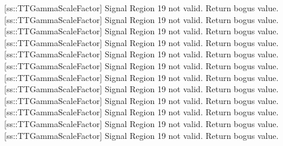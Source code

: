 [ss::TTGammaScaleFactor] Signal Region 19 not valid.  Return bogus value.
[ss::TTGammaScaleFactor] Signal Region 19 not valid.  Return bogus value.
[ss::TTGammaScaleFactor] Signal Region 19 not valid.  Return bogus value.
[ss::TTGammaScaleFactor] Signal Region 19 not valid.  Return bogus value.
[ss::TTGammaScaleFactor] Signal Region 19 not valid.  Return bogus value.
[ss::TTGammaScaleFactor] Signal Region 19 not valid.  Return bogus value.
[ss::TTGammaScaleFactor] Signal Region 19 not valid.  Return bogus value.
[ss::TTGammaScaleFactor] Signal Region 19 not valid.  Return bogus value.
[ss::TTGammaScaleFactor] Signal Region 19 not valid.  Return bogus value.
[ss::TTGammaScaleFactor] Signal Region 19 not valid.  Return bogus value.
[ss::TTGammaScaleFactor] Signal Region 19 not valid.  Return bogus value.
[ss::TTGammaScaleFactor] Signal Region 19 not valid.  Return bogus value.
